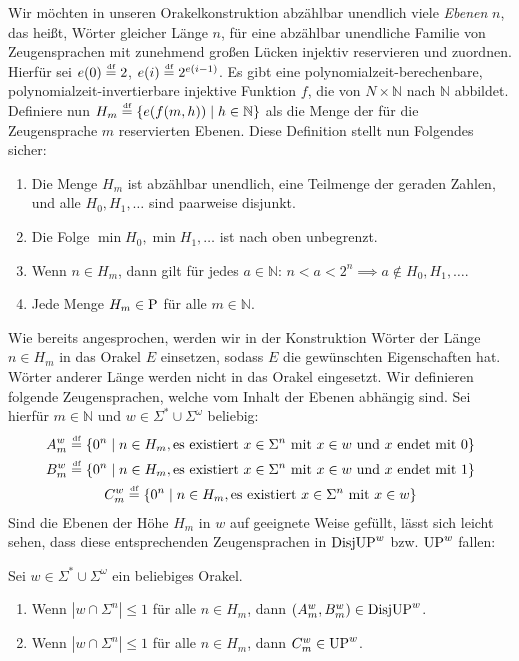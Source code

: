 Wir möchten in unseren Orakelkonstruktion abzählbar unendlich viele \emph{Ebenen} $n$, das heißt, Wörter gleicher Länge $n$, für eine abzählbar unendliche Familie von Zeugensprachen mit zunehmend großen Lücken injektiv reservieren und zuordnen.
Hierfür sei $e(0) \defeq 2$, $e(i) \defeq 2^{e(i-1)}$.
Es gibt eine polynomialzeit-berechenbare, polynomialzeit-invertierbare injektive Funktion $f$, die von $N\times\mathbb N$ nach $\mathbb N$ abbildet.
Definiere nun $H_m \defeq \{ e(f(m,h)) \mid h\in\mathbb N \}$ als die Menge der für die Zeugensprache $m$ reservierten Ebenen.
Diese Definition stellt nun Folgendes sicher:
\begin{observation}\label{obs:leveldefinitions}
    \begin{enumerate}
        \item Die Menge $H_m$ ist abzählbar unendlich, eine Teilmenge der geraden Zahlen, und alle $H_0, H_1, \dots$ sind paarweise disjunkt.
        \item Die Folge $\min H_0, \min H_1, \dots$ ist nach oben unbegrenzt.
        \item Wenn $n\in H_m$, dann gilt für jedes $a\in\mathbb N$: $n<a<2^{n} \implies a\not\in H_0, H_1, \dots$.
        \item Jede Menge $H_m\in \P$ für alle $m\in\mathbb N$.
    \end{enumerate}
\end{observation}


Wie bereits angesprochen, werden wir in der Konstruktion Wörter der Länge $n\in H_m$ in das Orakel $E$ einsetzen, sodass $E$ die gewünschten Eigenschaften hat.
Wörter anderer Länge werden nicht in das Orakel eingesetzt.
Wir definieren folgende Zeugensprachen, welche vom Inhalt der Ebenen abhängig sind. Sei hierfür $m\in\mathbb N$ und $w\in\Sigma^*\cup\Sigma^{\omega}$ beliebig:
\begin{gather*}
    A_m^w \defeq \{ 0^n \mid n\in H_m, \text{es existiert $x\in \Sigma^{n}$ mit } x\in w \text{ und $x$ endet mit $0$} \}\\
    B_m^w \defeq \{ 0^n \mid n\in H_m, \text{es existiert $x\in \Sigma^{n}$ mit } x\in w \text{ und $x$ endet mit $1$} \}\\
    C_m^w \defeq \{ 0^n \mid n\in H_m, \text{es existiert $x\in \Sigma^{n}$ mit } x\in w  \}
\end{gather*}
Sind die Ebenen der Höhe $H_m$ in $w$ auf geeignete Weise gefüllt, lässt sich leicht sehen, dass diese entsprechenden Zeugensprachen in $\DisjUP^w$ bzw. $\UP^w$ fallen:
\begin{claim}\label{claim:witnesslanguages}
    Sei $w\in\Sigma^*\cup\Sigma^\omega$ ein beliebiges Orakel.
    \begin{enumerate}
        \item Wenn $|w\cap \Sigma^{n}|\leq 1$ für alle $n\in H_m$, dann $(A_m^w, B_m^w)\in\DisjUP^w$.
        \item Wenn $|w\cap \Sigma^n|\leq 1$ für alle $n\in H_m$, dann $C_m^w \in \UP^w$.
    \end{enumerate}
\end{claim}

